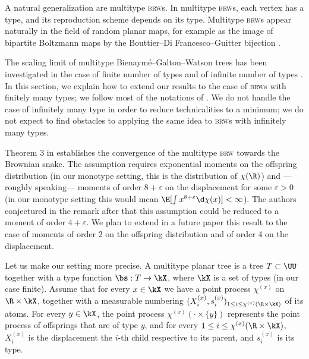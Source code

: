 \documentclass[10pt,a4paper]{article}
\newcommand{\brw}{\textsc{brw}\xspace}
\newcommand{\brws}{\textsc{brw}s\xspace}
\renewcommand{\kx}{s}
\begin{document}
A natural generalization are multitype \brws. In multitype \brws, each vertex has a type, and its reproduction scheme depends on its type. Multitype \brws appear naturally in the field of random planar maps, for example as the image of bipartite Boltzmann maps by the Bouttier--Di Francesco--Guitter bijection \cite{miermont2006invariance,stephenson2018local}. 

The scaling limit of multitype Bienaymé--Galton--Watson trees has been investigated %
in the case of finite number of types \cite{miermont2008invarianceGW} and of infinite number of types \cite{raphaelis2017scaling}. In this section, we explain how to extend our results to the case of \brws with finitely many types; we follow most of the notations of \cite{miermont2008invarianceGW}. We do not handle the case of infinitely many type in order to reduce technicalities to a minimum; we do not expect to find obstacles to applying the same idea to \brws with infinitely many types.

Theorem 3 in \cite{miermont2008invarianceGW} establishes the convergence of the multitype \brw towards the Brownian snake. The assumption requires exponential moments on the offspring distribution (in our monotype setting, this is the distribution of $\chi(\R)$) and ---roughly speaking--- moments of order $8+\varepsilon$ on the displacement for some $\varepsilon>0$ (in our monotype setting this would mean $\E[\int x^{8+\varepsilon} \d\chi(x)]<\infty$). The authors conjectured in the remark after \cite[Theorem 4]{miermont2008invarianceGW} that this assumption could be reduced to a moment of order $4+\varepsilon$. We plan to extend in a future paper this result to the case of moments of order 2 on the offspring distribution and of order 4 on the displacement. %


Let us make our setting more precise. %
A multitype planar tree is a tree $T\subset \UU$ together with a type function $\bs:T\to \kX$, where $\kX$ is a set of types (in our case finite). Assume that for every $x\in\kX$ we have a point process $\chi^{(x)}$ on $\R\times\kX$, together with a measurable numbering $(X^{(x)}_i, \kx^{(x)}_i)_{1\leq i \leq \chi^{(x)}(\R\times\kX)}$ of its atoms. For every $y\in\kX$, the point process $\chi^{(x)}(\cdot \times \{y\})$ represents the point process of offsprings that are of type $y$, and for every $1\leq i \leq \chi^{(x)}(\R\times\kX)$, $X^{(x)}_i$ is the displacement the $i$-th child respective to its parent, and $\kx^{(x)}_i$ is its type. 
\end{document}
